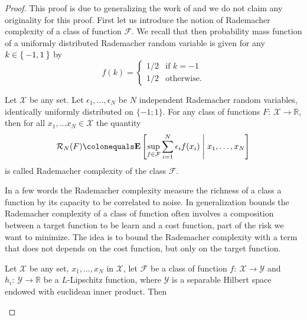 \begin{proof}
    This proof is due to \citet{maurer2016vector} generalizing the work of
    \citet[section 4.3]{bartlett2002rademacher} and we do not claim any
    originality for this proof. First let us introduce the notion of Rademacher
    complexity of a class of function $\mathcal{F}$. We recall that then
    probability mass function of a uniformly distributed Rademacher random
    variable is given for any $k\in\Set{-1,1}$ by
    \begin{dmath*}
        f(k)=
        \begin{cases}
            1/2 & \text{if $k=-1$} \\
            1/2 & \text{otherwise.}
        \end{cases}
    \end{dmath*}
    \begin{definition}
        Let $\mathcal{X}$ be any set. Let $\epsilon_1,\hdots,\epsilon_N$ be $N$
        independent Rademacher random variables, identically uniformly
        distributed on $\{-1;1\}$. For any class of functions
        $F:~\mathcal{X}\to\mathbb{R}$, then for all $x_1, \hdots x_N\in
        \mathcal{X}$ the quantity
        \begin{dmath*}
            \mathcal{R}_N(F) \colonequals \expectation\left[ \sup_{f\in
            \mathcal{F}} \sum_{i=1}^N \epsilon_i f(x_i) \;\middle|\; x_1,
            \dots, x_N \right]
        \end{dmath*}
        is called Rademacher complexity of the class $\mathcal{F}$.
    \end{definition}
    In a few words the Rademacher complexity measure the richness of a class a
    function by its capacity to be correlated to noise. In generalization
    bounds the Rademacher complexity of a class of function often involves a
    composition between a target function to be learn and a cost function, part
    of the risk we want to minimize. The idea is to bound the Rademacher
    complexity with a term that does not depends on the cost function, but only
    on the target function.
    \begin{proposition}
        \label{pr:radswap}
        Let $\mathcal{X}$ be any set, $x_1, \hdots, x_N$ in $\mathcal{X}$, let
        $\mathcal{F}$ be a class of function $f:~\mathcal{X}\to\mathcal{Y}$ and
        $h_i:~\mathcal{Y}\to\mathbb{R}$ be a $L$-Lipschitz function, where
        $\mathcal{Y}$ is a separable Hilbert space endowed with
        euclidean inner product. Then

\end{proposition}
\end{proof}
